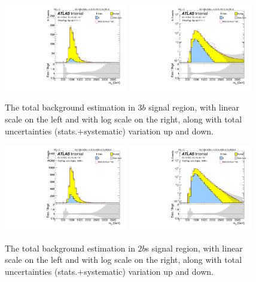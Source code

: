\begin{figure}
\begin{center}
\includegraphics[width=0.48\textwidth,angle=-90]{figures/boosted/Signal_Syst/Moriond_bkg_9_ThreeTag_Signal_mHH_l_blind.pdf}
\includegraphics[width=0.48\textwidth,angle=-90]{figures/boosted/Signal_Syst/Moriond_bkg_9_ThreeTag_Signal_mHH_l_1_blind.pdf}
\caption{The total background estimation in $3b$ signal region, with linear scale on the left and with log scale on the right, along with total uncertainties (stats.$+$systematic) variation up and down.}
\label{fig:FinalBkg_sys-3b}
\end{center}
\end{figure}


\begin{figure}
\begin{center}
\includegraphics[width=0.48\textwidth,angle=-90]{figures/boosted/Signal_Syst/Moriond_bkg_9_TwoTag_split_Signal_mHH_l_blind.pdf}
\includegraphics[width=0.48\textwidth,angle=-90]{figures/boosted/Signal_Syst/Moriond_bkg_9_TwoTag_split_Signal_mHH_l_1_blind.pdf}
\caption{The total background estimation in $2b$s signal region, with linear scale on the left and with log scale on the right, along with total uncertainties (stats.$+$systematic) variation up and down.}
\label{fig:FinalBkg_sys-2b}
\end{center}
\end{figure}

